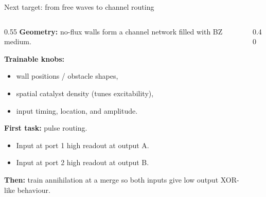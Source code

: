 \documentclass[aspectratio=169,11pt]{beamer}
\begin{document}
\begin{frame}{Next target: from free waves to channel routing}

\begin{columns}
\begin{column}{0.55\textwidth}
\textbf{Geometry:} no-flux walls form a channel network filled with BZ medium.

\vspace{0.2cm}
\textbf{Trainable knobs:}
\begin{itemize}
    \item wall positions / obstacle shapes,
    \item spatial catalyst density (tunes excitability),
    \item input timing, location, and amplitude.
\end{itemize}

\vspace{0.2cm}
\textbf{First task:} pulse routing.
\begin{itemize}
    \item Input at port 1 \textrightarrow{} high readout at output A.
    \item Input at port 2 \textrightarrow{} high readout at output B.
\end{itemize}

\vspace{0.2cm}
\textbf{Then:} train annihilation at a merge so both inputs give low output \textrightarrow{} XOR-like behaviour.
\end{column}

\begin{column}{0.40\textwidth}
\centering
{}
\end{column}
\end{columns}

\end{frame}
\end{document}
